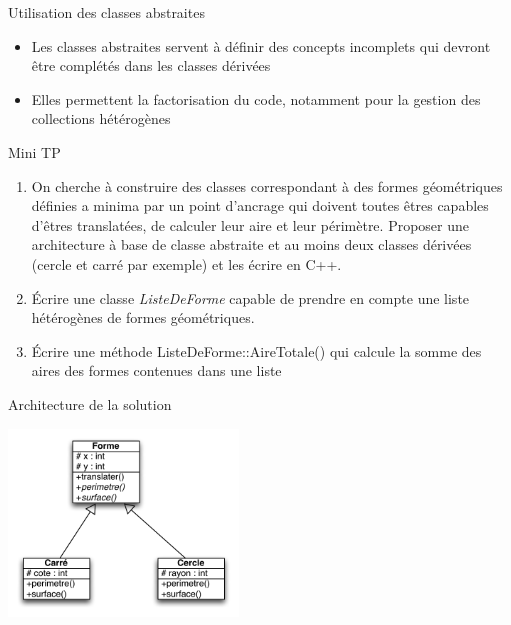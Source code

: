 \begin{frame}{Utilisation des classes abstraites}
\begin{itemize}
\item Les classes abstraites servent à définir des concepts incomplets qui devront être complétés dans les classes dérivées
\item Elles permettent la factorisation du code, notamment pour la gestion des collections hétérogènes
\end{itemize}
\end{frame}

\begin{frame}{Mini TP}
\begin{enumerate}
\item On cherche à construire des classes correspondant à des formes géométriques définies a minima par un point d'ancrage qui doivent toutes êtres capables d'êtres translatées, de calculer leur aire et leur périmètre. Proposer une architecture à base de classe abstraite et au moins deux classes dérivées (cercle et carré par exemple) et les écrire en C++.
\item Écrire une classe \textit{ListeDeForme} capable de prendre en compte une liste hétérogènes de formes géométriques.
\item Écrire une méthode ListeDeForme::AireTotale() qui calcule la somme des aires des formes contenues dans une liste
\end{enumerate}
\end{frame}

\begin{frame}{Architecture de la solution}
\begin{center}
\includegraphics[height=5cm]{fig/forme1.pdf}
\end{center}
\end{frame}
